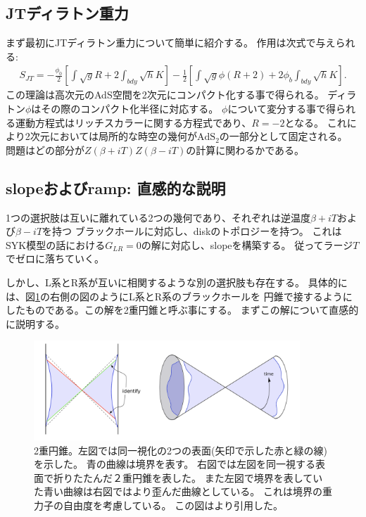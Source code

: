 \subsection{JTディラトン重力}
まず最初にJTディラトン重力について簡単に紹介する。
作用は次式で与えられる:
\begin{align}
	S_{JT} = -\frac{\phi_0}{2}\left[\int \sqrt{g}R + 2\int_{bdy}\sqrt{h}K \right]
			-\frac{1}{2}\left[
				\int \sqrt{g}\phi(R+2) + 2\phi_b\int_{bdy}\sqrt{h}K
			\right].
	\label{eq:JTgravity}
\end{align}
この理論は高次元のAdS空間を2次元にコンパクト化する事で得られる。
ディラトン$\phi$はその際のコンパクト化半径に対応する。
$\phi$について変分する事で得られる運動方程式はリッチスカラーに関する方程式であり、$R = -2$となる。
これにより2次元においては局所的な時空の幾何が$\mathrm{AdS}_2$の一部分として固定される。
問題はどの部分が$Z(\beta + iT)Z(\beta - iT)$の計算に関わるかである。

\subsection{slopeおよびramp: 直感的な説明}
1つの選択肢は互いに離れている2つの幾何であり、それぞれは逆温度$\beta + iT$および$\beta - iT$を持つ
ブラックホールに対応し、diskのトポロジーを持つ。
これはSYK模型の話における$G_{LR} = 0$の解に対応し、slopeを構築する。
従ってラージ$T$でゼロに落ちていく。

しかし、L系とR系が互いに相関するような別の選択肢も存在する。
具体的には、図\ref{fig:double_cone}の右側の図のようにL系とR系のブラックホールを
円錐で接するようにしたものである。この解を2重円錐と呼ぶ事にする。
まずこの解について直感的に説明する。

\begin{figure}[ht]
	\centering
	\includegraphics[width=10cm]{figures/double_cone}
	\caption{
	2重円錐。左図では同一視化の2つの表面(矢印で示した赤と緑の線)を示した。
	青の曲線は境界を表す。
	右図では左図を同一視する表面で折りたたんだ２重円錐を表した。
	また左図で境界を表していた青い曲線は右図ではより歪んだ曲線としている。
	これは境界の重力子の自由度を考慮している。
	この図は\cite{polchinski_chaos}より引用した。}
	\label{fig:double_cone}
\end{figure}


